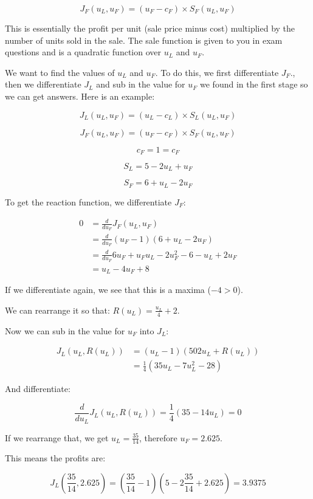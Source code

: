\[
  J_F(u_L, u_F) = (u_F - c_F) \times S_F(u_L, u_F)
\]

This is essentially the profit per unit (sale price minus cost) multiplied by
the number of units sold in the sale. The sale function is given to you in exam
questions and is a quadratic function over $u_L$ and $u_F$.

We want to find the values of $u_L$ and $u_F$. To do this, we first
differentiate $J_F$., then we differentiate $J_L$ and sub in the value for $u_F$
we found in the first stage so we can get answers. Here is an example:

\[
  J_L(u_L, u_F) = (u_L - c_L) \times S_L(u_L, u_F)
\]

\[
  J_F(u_L, u_F) = (u_F - c_F) \times S_F(u_L, u_F)
\]

\[
  c_F = 1 = c_F
\]

\[
  S_L =  5 - 2u_L + u_F
\]

\[
  S_F = 6 + u_L - 2u_F
\]

To get the reaction function, we differentiate $J_F$:

\[
  \begin{split}
    0 &= \frac{d}{du_F}J_F(u_L,u_F)\\
      &= \frac{d}{du_F}(u_F - 1)(6 + u_L - 2u_F)\\
      &= \frac{d}{du_F}6u_F + u_Fu_L - 2u_F^2 - 6 - u_L + 2u_F\\
      &= u_L - 4u_F + 8
  \end{split}
\]

If we differentiate again, we see that this is a maxima ($-4 > 0$).

We can rearrange it so that: $R(u_L) = \frac{u_L}{4} + 2$.

Now we can sub in the value for $u_F$ into $J_L$:

\[
  \begin{split}
    J_L(u_L, R(u_L)) &= (u_L - 1)(5 0 2u_L + R(u_L))\\
                     &= \frac{1}{4}(35u_L - 7u_L^2 - 28)
  \end{split}
\]

And differentiate:

\[
  \frac{d}{du_L}J_L(u_L, R(u_L)) = \frac{1}{4}(35 - 14u_L) = 0
\]

If we rearrange that, we get $u_L = \frac{35}{14}$, therefore $u_F = 2.625$.

This means the profits are:

\[
  J_L(\frac{35}{14}, 2.625) = (\frac{35}{14} - 1)(5 - 2\frac{35}{14} + 2.625) = 3.9375
\]

